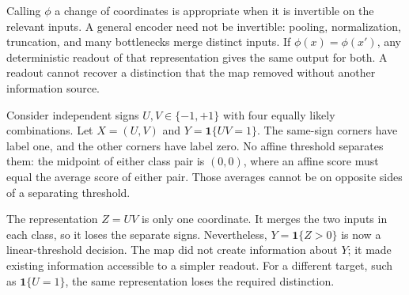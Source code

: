 Calling $\phi$ a change of coordinates is appropriate when it is invertible on the relevant inputs. A general encoder need not be invertible: pooling, normalization, truncation, and many bottlenecks merge distinct inputs. If $\phi(x)=\phi(x')$, any deterministic readout of that representation gives the same output for both. A readout cannot recover a distinction that the map removed without another information source.

Consider independent signs $U,V\in\{-1,+1\}$ with four equally likely combinations. Let $X=(U,V)$ and $Y=\mathbf1\{UV=1\}$. The same-sign corners have label one, and the other corners have label zero. No affine threshold separates them: the midpoint of either class pair is $(0,0)$, where an affine score must equal the average score of either pair. Those averages cannot be on opposite sides of a separating threshold.

The representation $Z=UV$ is only one coordinate. It merges the two inputs in each class, so it loses the separate signs. Nevertheless, $Y=\mathbf1\{Z>0\}$ is now a linear-threshold decision. The map did not create information about $Y$; it made existing information accessible to a simpler readout. For a different target, such as $\mathbf1\{U=1\}$, the same representation loses the required distinction.

\par\addvspace{\intextsep}\noindent\begin{minipage}{\linewidth}
\centering
{}
\label{fig:bad-vs-good-space}
\end{minipage}\par\addvspace{\intextsep}

